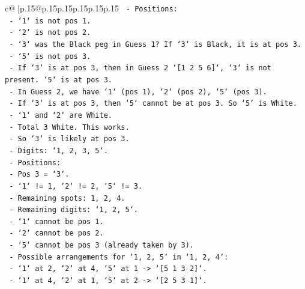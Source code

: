 \documentclass{article}
\begin{document}
{\begin{supertabular}{c@{$\;$}|p{.15\linewidth}@{}p{.15\linewidth}p{.15\linewidth}p{.15\linewidth}p{.15\linewidth}p{.15\linewidth}}
{{{\texttt{                    {-} Positions:} \\
\texttt{                        {-} `1` is not pos 1.} \\
\texttt{                        {-} `2` is not pos 2.} \\
\texttt{                        {-} `3` was the Black peg in Guess 1? If `3` is Black, it is at pos 3.} \\
\texttt{                        {-} `5` is not pos 3.} \\
\texttt{                        {-} If `3` is at pos 3, then in Guess 2 `{[}1 2 5 6{]}`, `3` is not present. `5` is at pos 3.} \\
\texttt{                        {-} In Guess 2, we have `1` (pos 1), `2` (pos 2), `5` (pos 3).} \\
\texttt{                        {-} If `3` is at pos 3, then `5` cannot be at pos 3. So `5` is White.} \\
\texttt{                        {-} `1` and `2` are White.} \\
\texttt{                        {-} Total 3 White. This works.} \\
\texttt{                    {-} So `3` is likely at pos 3.} \\
\texttt{                    {-} Digits: `1, 2, 3, 5`.} \\
\texttt{                    {-} Positions:} \\
\texttt{                        {-} Pos 3 = `3`.} \\
\texttt{                        {-} `1` != 1, `2` != 2, `5` != 3.} \\
\texttt{                        {-} Remaining spots: 1, 2, 4.} \\
\texttt{                        {-} Remaining digits: `1, 2, 5`.} \\
\texttt{                        {-} `1` cannot be pos 1.} \\
\texttt{                        {-} `2` cannot be pos 2.} \\
\texttt{                        {-} `5` cannot be pos 3 (already taken by 3).} \\
\texttt{                        {-} Possible arrangements for `1, 2, 5` in `1, 2, 4`:} \\
\texttt{                            {-} `1` at 2, `2` at 4, `5` at 1 {-}> `{[}5 1 3 2{]}`.} \\
\texttt{                            {-} `1` at 4, `2` at 1, `5` at 2 {-}> `{[}2 5 3 1{]}`.} \\
}}}
\end{supertabular}}
\end{document}

